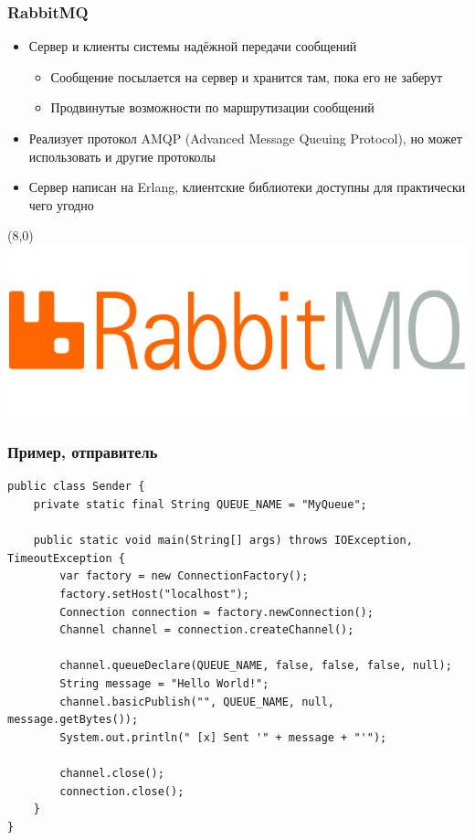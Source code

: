 \documentclass[xetex,mathserif,serif]{beamer}
\begin{document}
    \begin{frame}
        \frametitle{RabbitMQ}
        \begin{itemize}
            \item Сервер и клиенты системы надёжной передачи сообщений
            \begin{itemize}
                \item Сообщение посылается на сервер и хранится там, пока его не заберут
                \item Продвинутые возможности по маршрутизации сообщений
            \end{itemize}
            \item Реализует протокол AMQP (Advanced Message Queuing Protocol), но может использовать и другие протоколы
            \item Сервер написан на Erlang, клиентские библиотеки доступны для практически чего угодно
        \end{itemize}
        \begin{textblock}{3}(8,0)
            \includegraphics[width=\textwidth]{rabbitmqLogo.png}
        \end{textblock}
    \end{frame}

    \begin{frame}[fragile]
        \frametitle{Пример, отправитель}
        \begin{ssmall}
            \begin{verbatim}
public class Sender {
    private static final String QUEUE_NAME = "MyQueue";

    public static void main(String[] args) throws IOException, TimeoutException {
        var factory = new ConnectionFactory();
        factory.setHost("localhost");
        Connection connection = factory.newConnection();
        Channel channel = connection.createChannel();

        channel.queueDeclare(QUEUE_NAME, false, false, false, null);
        String message = "Hello World!";
        channel.basicPublish("", QUEUE_NAME, null, message.getBytes());
        System.out.println(" [x] Sent '" + message + "'");

        channel.close();
        connection.close();
    }
}
            \end{verbatim}
        \end{ssmall}
    \end{frame}
\end{document}
